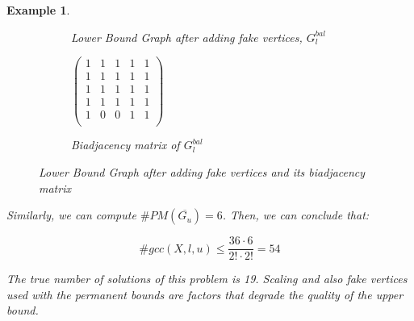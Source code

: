 \documentclass[jair,twoside,11pt,theapa]{article}
\newtheorem{example}[theorem]{Example}
\begin{document}
\begin{example}
\begin{figure*}
\begin{subfigure}[normal]{0.4\textwidth}
        \caption{Lower Bound Graph after adding fake vertices, $G^{bal}_l$}
	\label{LBGbal}
\end{subfigure}
\hspace{2cm}
\begin{subfigure}[normal]{0.2\textwidth}
	\centering
     \vspace{1.8cm}
		$
	\begin{pmatrix}
		1 & 1 & 1 & 1 & 1 \\
		1 & 1 & 1 & 1 & 1 \\
		1 & 1 & 1 & 1 & 1 \\
		1 & 1 & 1 & 1 & 1 \\
		1 & 0 & 0 & 1 & 1 \\
	\end{pmatrix}
		$
       
    \caption{Biadjacency matrix of $G^{bal}_l$}
	\label{BiadjacencymatrixOfLBG}
\end{subfigure}
\caption{Lower Bound Graph after adding fake vertices and its biadjacency matrix}
\end{figure*}

Similarly, we can compute $\#PM(\overline{G_u})=6$. Then, we can conclude that:

\begin{equation*}
	\#gcc(X,l,u) \leq \frac{36 \cdot 6 }{2! \cdot 2!} = 54
\end{equation*}

The true number of solutions of this problem is 19. Scaling and also fake vertices used with the permanent bounds are factors that degrade the quality of the upper bound.
\end{example}	



\end{document}
